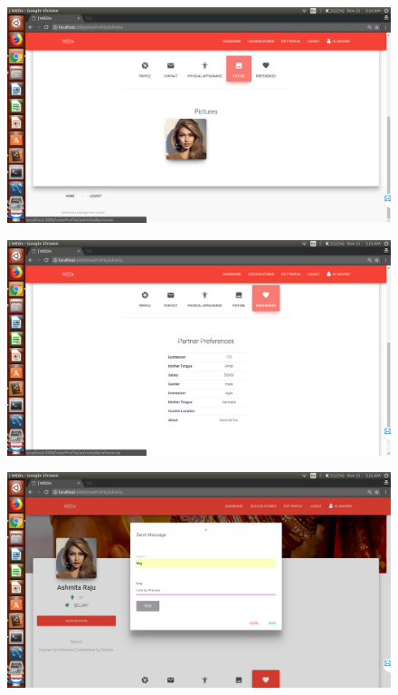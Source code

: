 \documentclass[12pt]{report}
\begin{document}
\begin{figure}[!htb]
    \centering
    \includegraphics[width=1\textwidth]{sc-14.png}
\end{figure}

\begin{figure}[!htb]
    \centering
    \includegraphics[width=1\textwidth]{sc-15.png}
\end{figure}

\begin{figure}[!htb]
    \centering
    \includegraphics[width=1\textwidth]{sc-16.png}
\end{figure}
\end{document}
